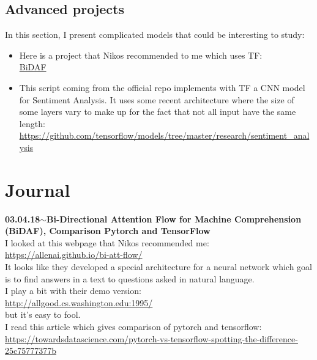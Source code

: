 \documentclass[11pt,a4paper]{article}
\newenvironment{loggentry}[2]%
{\noindent\textbf{#1}\hspace{1cm}$\mathbf{\sim}$\text{ }\textbf{#2}\\}{\vspace{0.5cm}}
\begin{document}
\subsection{Advanced projects}
In this section, I present complicated models that could be interesting to study:
\begin{itemize}
\item Here is a project that Nikos recommended to me which uses TF:\\
\href{https://allenai.github.io/bi-att-flow/}{BiDAF}
\item This script coming from the official repo implements with TF a CNN model for Sentiment Analysis. It uses some recent architecture where the size of some layers vary to make up for the fact that not all input have the same length:\\
\url{https://github.com/tensorflow/models/tree/master/research/sentiment_analysis}
\end{itemize}

\section{Journal}

\begin{loggentry}{03.04.18}{Bi-Directional Attention Flow for Machine Comprehension (BiDAF), Comparison Pytorch and TensorFlow}
I looked at this webpage that Nikos recommended me:\\
\url{https://allenai.github.io/bi-att-flow/}\\
It looks like they developed a special architecture for a neural network which goal is to find answers in a text to questions asked in natural language.\\
I play a bit with their demo version:\\
\url{http://allgood.cs.washington.edu:1995/}\\
but it's easy to fool.\\
I read this article which gives comparison of pytorch and tensorflow:\\
\url{https://towardsdatascience.com/pytorch-vs-tensorflow-spotting-the-difference-25c75777377b}\\
\end{loggentry}
\end{document}
